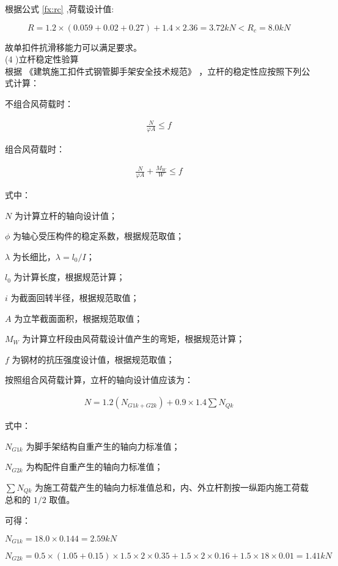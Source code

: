 根据公式 \ref{fx:rc} ,荷载设计值:

$$R=1.2×(0.059+0.02+0.27)+1.4×2.36=3.72kN<R_c=8.0kN$$

故单扣件抗滑移能力可以满足要求。\\

(4 )立杆稳定性验算\\

根据 《建筑施工扣件式钢管脚手架安全技术规范》 ，立杆的稳定性应按照下列公式计算：

不组合风荷载时：

\begin{align}
    \label{fx:nw}
    \frac{N}{\varphi A}\leq f
\end{align}

组合风荷载时：

\begin{align}
    \label{fx:w}
    \frac{N}{\varphi A}+ \frac{M_W}{W}\leq f
\end{align}

式中：

$N$ 为计算立杆的轴向设计值；

$\phi$ 为轴心受压构件的稳定系数，根据规范取值；

$\lambda$ 为长细比，$\lambda =l_0/I$；

$l_0$ 为计算长度，根据规范计算；

$i$ 为截面回转半径，根据规范取值；

$A$ 为立竿截面面积，根据规范取值；

$M_W$ 为计算立杆段由风荷载设计值产生的弯矩，根据规范计算；

$f$ 为钢材的抗压强度设计值，根据规范取值；

按照组合风荷载计算，立杆的轴向设计值应该为：

\begin{align}
    \label{fx:Nzhou}
    N=1.2(N_{G1k+G2k})+0.9\times 1.4\sum N_{Qk}
\end{align}

式中：

$N_{G1k}$ 为脚手架结构自重产生的轴向力标准值； 

$N_{G2k}$ 为构配件自重产生的轴向力标准值；

$\sum N_{Qk}$ 为施工荷载产生的轴向力标准值总和，内、外立杆割按一纵距内施工荷载
总和的 $1/2$ 取值。

可得：

$N_{G1k}=18.0\times 0.144=2.59 kN$

$N_{G2k}=0.5\times (1.05+0.15)\times 1.5\times 2\times 0.35+1.5\times 2\times 0.16+1.5\times 18\times 0.01=1.41 kN$

